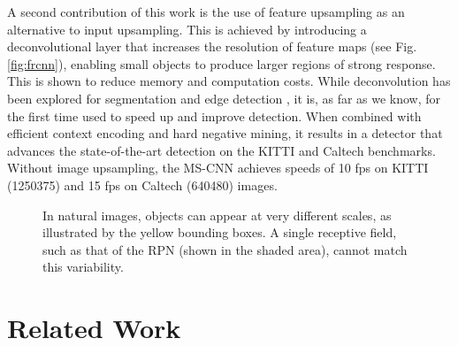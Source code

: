\documentclass[runningheads]{llncs}
\begin{document}
A second contribution of this work is the use of feature upsampling as an
alternative to input upsampling. This is achieved by introducing a
deconvolutional layer that increases the resolution of feature maps
(see Fig. \ref{fig:frcnn}), enabling small objects to produce larger
regions of strong response. This is shown to  reduce memory and computation
costs. While deconvolution has been explored for segmentation
\cite{DBLP:conf/cvpr/LongSD15} and edge
detection \cite{DBLP:conf/iccv/XieT15}, it is, as far as we know, for
the first time used to speed up and improve detection. When combined
with efficient context encoding and hard negative mining, it results
in a detector that advances the state-of-the-art detection on
the KITTI \cite{DBLP:conf/cvpr/GeigerLU12} and
Caltech \cite{DBLP:journals/pami/DollarWSP12} benchmarks.
Without image upsampling, the MS-CNN achieves speeds of 10 fps on KITTI
(1250375) and 15 fps on Caltech (640480) images.



\begin{figure}[!t]
\centering
\centerline{}
\caption{In natural images, objects can appear at very different
scales, as illustrated by the yellow bounding boxes.
A single receptive field, such as that of the RPN
\cite{DBLP:conf/nips/shaoqing15fasterRcnn} (shown in the shaded area),
cannot match this variability.}
\label{fig:receptive field}
\end{figure}

\section{Related Work}
\end{document}
